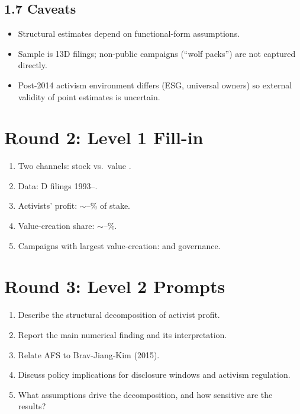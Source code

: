 \documentclass[11pt]{article}
\newcommand{\blank}[1]{\underline{\hspace{#1}}}
\begin{document}
\subsection*{1.7 Caveats}
\begin{alertbox}
\begin{itemize}
\item Structural estimates depend on functional-form assumptions.
\item Sample is 13D filings; non-public campaigns (``wolf packs'') are not captured directly.
\item Post-2014 activism environment differs (ESG, universal owners) so external validity of point estimates is uncertain.
\end{itemize}
\end{alertbox}

\section*{Round 2: Level 1 Fill-in}
\begin{enumerate}
\item Two channels: stock \blank{1.5cm} vs.\ value \blank{1.5cm}.
\item Data: \blank{1cm}D filings 1993--\blank{1cm}.
\item Activists' profit: $\sim$\blank{1cm}--\blank{1cm}\% of stake.
\item Value-creation share: $\sim$\blank{1cm}--\blank{1cm}\%.
\item Campaigns with largest value-creation: \blank{1.5cm} and governance.
\end{enumerate}

\section*{Round 3: Level 2 Prompts}
\begin{enumerate}
\item Describe the structural decomposition of activist profit.
\item Report the main numerical finding and its interpretation.
\item Relate AFS to Brav-Jiang-Kim (2015).
\item Discuss policy implications for disclosure windows and activism regulation.
\item What assumptions drive the decomposition, and how sensitive are the results?
\end{enumerate}
\end{document}
